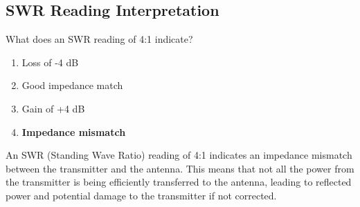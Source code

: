 \subsection{SWR Reading Interpretation}
\label{T7C06}

\begin{tcolorbox}[colback=gray!10!white,colframe=black!75!black,title=T7C06]
What does an SWR reading of 4:1 indicate?
\begin{enumerate}[noitemsep]
    \item Loss of -4 dB
    \item Good impedance match
    \item Gain of +4 dB
    \item \textbf{Impedance mismatch}
\end{enumerate}
\end{tcolorbox}

An SWR (Standing Wave Ratio) reading of 4:1 indicates an impedance mismatch between the transmitter and the antenna. This means that not all the power from the transmitter is being efficiently transferred to the antenna, leading to reflected power and potential damage to the transmitter if not corrected.